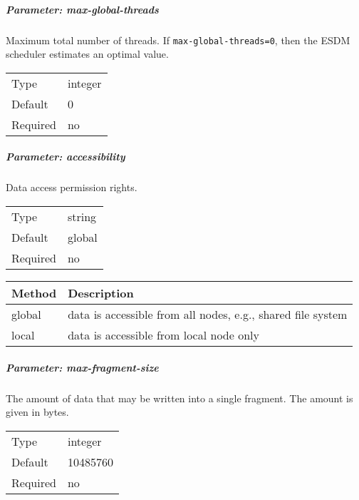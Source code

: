 \subparagraph{Parameter: max-global-threads}
Maximum total number of threads.
If \lstinline|max-global-threads=0|, then the ESDM scheduler estimates an optimal value.

\begin{preserve}
  \noindent
  \begin{tabular}{ll}
    Type     & integer \\ 
    Default  & 0       \\ 
    Required & no      \\ 
  \end{tabular}
\end{preserve}
\FloatBarrier
\vspace{\gapsize}

\subparagraph{Parameter: accessibility}
Data access permission rights.

\begin{preserve}
  \noindent
  \begin{tabular}{ll}
    Type     & string \\ 
    Default  & global \\ 
    Required & no     \\ 
  \end{tabular}
\end{preserve}

\begin{preserve}
  \begin{center}
    \begin{tabularx}{\textwidth}{lX}
      Method & Description                                                 \\ 
      \hline
      global & data is accessible from all nodes, e.g., shared file system \\ 
      local  & data is accessible from local node only                     \\ 
    \end{tabularx}
  \end{center}
\end{preserve}
\FloatBarrier
\vspace{\gapsize}

\subparagraph{Parameter: max-fragment-size}
The amount of data that may be written into a single fragment. 
The amount is given in bytes.

\begin{preserve}
  \noindent
  \begin{tabular}{ll}
    Type     & integer  \\ 
    Default  & 10485760 \\ 
    Required & no       \\ 
  \end{tabular}
\end{preserve}
\FloatBarrier
\vspace{\gapsize}


